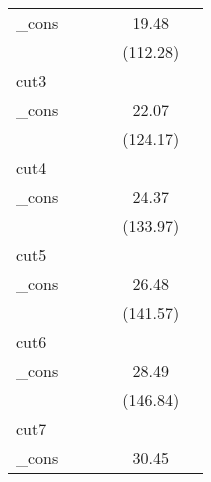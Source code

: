 {\begin{tabular}{l*{5}{c}}
\_cons      &                     &                     &                     &       19.48\sym{***}&                     \\
            &                     &                     &                     &    (112.28)         &                     \\
\hline
cut3        &                     &                     &                     &                     &                     \\
\_cons      &                     &                     &                     &       22.07\sym{***}&                     \\
            &                     &                     &                     &    (124.17)         &                     \\
\hline
cut4        &                     &                     &                     &                     &                     \\
\_cons      &                     &                     &                     &       24.37\sym{***}&                     \\
            &                     &                     &                     &    (133.97)         &                     \\
\hline
cut5        &                     &                     &                     &                     &                     \\
\_cons      &                     &                     &                     &       26.48\sym{***}&                     \\
            &                     &                     &                     &    (141.57)         &                     \\
\hline
cut6        &                     &                     &                     &                     &                     \\
\_cons      &                     &                     &                     &       28.49\sym{***}&                     \\
            &                     &                     &                     &    (146.84)         &                     \\
\hline
cut7        &                     &                     &                     &                     &                     \\
\_cons      &                     &                     &                     &       30.45\sym{***}&                     \\

\end{tabular}}
